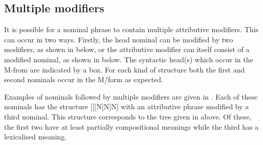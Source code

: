 \subsection{Multiple modifiers}\label{sec:MulMod}
It is possible for a nominal phrase to contain multiple attributive modifiers.
This can occur in two ways.
Firstly, the head nominal can be modified by two modifiers, as shown in  below,
or the attributive modifier can itself consist of a modified nominal, as shown in  below.
The syntactic head(s) which occur in the M-from are indicated by a box.
For each kind of structure both the first and second nominals occur in the M\=/form as expected.

\begin{multicols}{2}
	\begin{exe}
		\label{tr:MulMod}
		\label{tr:ModModN}
	\end{exe}
\end{multicols}

Examples of nominals followed by multiple modifiers
are given in .
Each of these nominals has the structure [[[N]N]N]
with an attributive phrase modified by a third nominal.
This structure corresponds to the tree given in  above.
Of these, the first two have at least partially compositional meanings
while the third has a lexicalised meaning.


